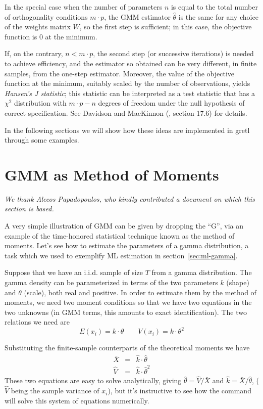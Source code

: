 In the special case when the number of parameters $n$ is equal to the
total number of orthogonality conditions $m \cdot p$, the GMM
estimator $\hat{\theta}$ is the same for any choice of the weights
matrix $W$, so the first step is sufficient; in this case, the
objective function is 0 at the minimum. 

If, on the contrary, $n < m \cdot p$, the second step (or successive
iterations) is needed to achieve efficiency, and the estimator so
obtained can be very different, in finite samples, from the one-step
estimator. Moreover, the value of the objective function at the
minimum, suitably scaled by the number of observations, yields
\emph{Hansen's J statistic}; this statistic can be interpreted as a
test statistic that has a $\chi^2$ distribution with $m \cdot p -n $
degrees of freedom under the null hypothesis of correct specification.
See Davidson and MacKinnon (\citeyear{davidson-mackinnon93}, section
17.6) for details.

In the following sections we will show how these ideas are
implemented in gretl through some examples.

\section{GMM as Method of Moments}
\label{sec:gmm-as-mom}

\emph{We thank Alecos Papadopoulos, who kindly contributed a document
  on which this section is based.}

A very simple illustration of GMM can be given by dropping the ``G'',
via an example of the time-honored statistical technique known as the
method of moments. Let's see how to estimate the parameters of a gamma
distribution, a task which we used to exemplify ML estimation in
section~\ref{sec:ml-gamma}.

Suppose that we have an i.i.d. sample of size $T$ from a gamma
distribution. The gamma density can be parameterized in terms of the
two parameters $k$ (shape) and $\theta$ (scale), both real and
positive.  In order to estimate them by the method of moments, we need
two moment conditions so that we have two equations in the two
unknowns (in GMM terms, this amounts to exact identification). The two
relations we need are
\[
  E(x_i) = k \cdot \theta \qquad V(x_i) = k \cdot \theta^2
\]

Substituting the finite-sample counterparts of the theoretical moments
we have
\begin{eqnarray}
  \label{eq:mm-ex-mean}
  \bar{X} & = & \hat{k} \cdot \hat{\theta} \\
  \label{eq:mm-ex-var}
  \hat{V} & = & \hat{k} \cdot \hat{\theta}^2
\end{eqnarray}
These two equations are easy to solve analytically, giving
$\hat{\theta} = \hat{V}/\bar{X}$ and
$\hat{k} = \bar{X}/\hat{\theta}$, ($\hat{V}$ being the sample
variance of $x_i$), but it's instructive to see how the 
command will solve this system of equations numerically.

